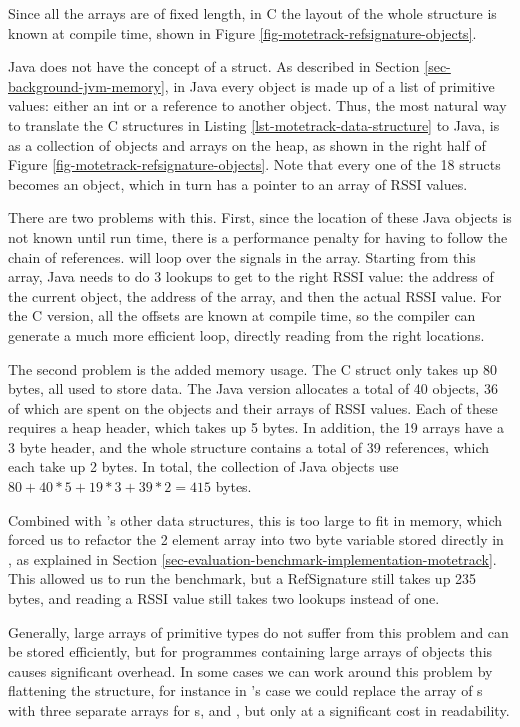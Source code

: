 Since all the arrays are of fixed length, in C the layout of the whole structure is known at compile time, shown in Figure \ref{fig-motetrack-refsignature-objects}.

Java does not have the concept of a struct. As described in Section \ref{sec-background-jvm-memory}, in Java every object is made up of a list of primitive values: either an int or a reference to another object. Thus, the most natural way to translate the C structures in Listing \ref{lst-motetrack-data-structure} to Java, is as a collection of objects and arrays on the heap, as shown in the right half of Figure \ref{fig-motetrack-refsignature-objects}. Note that every one of the 18  structs becomes an object, which in turn has a pointer to an array of RSSI values.

There are two problems with this. First, since the location of these Java objects is not known until run time, there is a performance penalty for having to follow the chain of references.  will loop over the signals in the  array. Starting from this array, Java needs to do 3 lookups to get to the right RSSI value: the address of the current  object, the address of the  array, and then the actual RSSI value. For the C version, all the offsets are known at compile time, so the compiler can generate a much more efficient loop, directly reading from the right locations.

The second problem is the added memory usage. The C struct only takes up 80 bytes, all used to store data. The Java version allocates a total of 40 objects, 36 of which are spent on the  objects and their arrays of RSSI values. Each of these requires a heap header, which takes up 5 bytes. In addition, the 19 arrays have a 3 byte header, and the whole structure contains a total of 39 references, which each take up 2 bytes. In total, the collection of Java objects use $80 + 40*5 + 19*3 + 39*2 = 415$ bytes.

Combined with 's other data structures, this is too large to fit in memory, which forced us to refactor the 2 element  array into two byte variable stored directly in , as explained in Section \ref{sec-evaluation-benchmark-implementation-motetrack}. This allowed us to run the benchmark, but a RefSignature still takes up 235 bytes, and reading a RSSI value still takes two lookups instead of one.

Generally, large arrays of primitive types do not suffer from this problem and can be stored efficiently, but for programmes containing large arrays of objects this causes significant overhead. In some cases we can work around this problem by flattening the structure, for instance in 's case we could replace the array of s with three separate arrays for s,  and , but only at a significant cost in readability.




